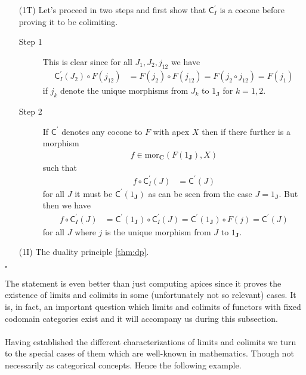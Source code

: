 \begin{prf}
\begin{enumerate}
\item[(1T)]
Let's proceed in two steps and first show that $\mathsf{C}_{I}^{\prime}$ is a cocone before proving it to be colimiting.
\begin{description}
\item[Step 1]
This is clear since for all $J_{1},J_{2},j_{12}$ we have
\begin{align*}
  \mathsf{C}_{I}^{\prime}(J_{2})
  \circ
  F(j_{12})
  &=
  F(j_{2})
  \circ
  F(j_{12})
  =
  F(j_{2} \circ j_{12})
  =
  F(j_{1})
\end{align*}
if $j_{k}$ denote the unique morphisms from $J_{k}$ to $1_{\mathbf{J}}$ for $k = 1,2$.
\item[Step 2]
If $\mathsf{C}^{\prime}$ denotes any cocone to $F$ with apex $X$ then if there further is a morphism
\begin{align*}
  f
  \in
  \mathrm{mor}_{\mathbf{C}}
  \left(
    F(1_{\mathbf{J}})
    ,
    X
  \right)
\end{align*}
such that
\begin{align*}
  f
  \circ
  \mathsf{C}_{I}^{\prime}(J)
  &=
  \mathsf{C}^{\prime}(J)
\end{align*}
for all $J$ it must be $\mathsf{C}^{\prime}(1_{\mathbf{J}})$ as can be seen from the case $J = 1_{\mathbf{J}}$. But then we have
\begin{align*}
  f
  \circ
  \mathsf{C}_{I}^{\prime}(J)
  &=
  \mathsf{C}^{\prime}(1_{\mathbf{J}})
  \circ
  \mathsf{C}_{I}^{\prime}(J)
  =
  \mathsf{C}^{\prime}(1_{\mathbf{J}})
  \circ
  F(j)
  =
  \mathsf{C}^{\prime}(J)
\end{align*}
for all $J$ where $j$ is the unique morphism from $J$ to $1_{\mathbf{J}}$.
\end{description}
\item[(1I)]
The duality principle \ref{thm:dp}.
\end{enumerate}
\phantom{proven}
\hfill
$\square$
\end{prf}
The statement is even better than just computing apices since it proves the existence of limits and colimits in some (unfortunately not so relevant) cases. It is, in fact, an important question which limits and colimits of functors with fixed codomain categories exist and it will accompany us during this subsection.
\\\\
Having established the different characterizations of limits and colimits we turn to the special cases of them which are well-known in mathematics. Though not necessarily as categorical concepts. Hence the following example.
